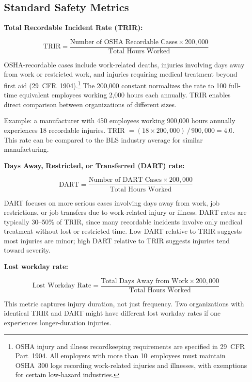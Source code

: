 \documentclass[11pt,openany]{book}
\begin{document}
\subsection{Standard Safety Metrics}
\label{subsec:safety-metrics}

\textbf{Total Recordable Incident Rate (TRIR):}

\[
\text{TRIR} = \frac{\text{Number of OSHA Recordable Cases} \times 200{,}000}
  {\text{Total Hours Worked}}
\]

OSHA-recordable cases include work-related deaths, injuries involving days
away from work or restricted work, and injuries requiring medical treatment
beyond first aid (29~CFR~1904).\footnote{OSHA injury and illness recordkeeping
requirements are specified in 29~CFR Part~1904. All employers with more than
10~employees must maintain OSHA~300 logs recording work-related injuries and
illnesses, with exemptions for certain low-hazard industries.} The 200{,}000
constant normalizes the rate to 100 full-time equivalent employees working
2{,}000 hours each annually. TRIR enables direct comparison between
organizations of different sizes.

Example: a manufacturer with 450 employees working 900{,}000 hours annually
experiences 18 recordable injuries. TRIR \(= (18 \times 200{,}000)\,/\,
900{,}000 = 4.0\). This rate can be compared to the BLS industry average for
similar manufacturing.

\textbf{Days Away, Restricted, or Transferred (DART) rate:}

\[
\text{DART} = \frac{\text{Number of DART Cases} \times 200{,}000}
  {\text{Total Hours Worked}}
\]

DART focuses on more serious cases involving days away from work, job
restrictions, or job transfers due to work-related injury or illness. DART
rates are typically 30--50\% of TRIR, since many recordable incidents involve
only medical treatment without lost or restricted time. Low DART relative to
TRIR suggests most injuries are minor; high DART relative to TRIR suggests
injuries tend toward severity.

\textbf{Lost workday rate:}

\[
\text{Lost Workday Rate} = \frac{\text{Total Days Away from Work} \times
  200{,}000}{\text{Total Hours Worked}}
\]

This metric captures injury duration, not just frequency. Two organizations
with identical TRIR and DART might have different lost workday rates if one
experiences longer-duration injuries.
\end{document}
